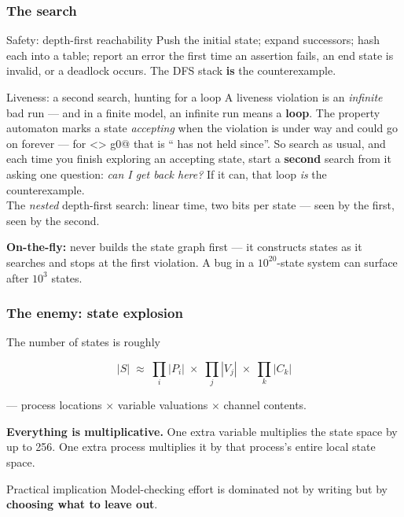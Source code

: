 \begin{frame}
  \frametitle{The search} \small

\begin{block}{Safety: depth-first reachability}\small
Push the initial state; expand successors; hash each into a table; report an error
the first time an assertion fails, an end state is invalid, or a deadlock occurs.
The DFS stack {\bf is} the counterexample.
\end{block}

\pause

\begin{block}{Liveness: a second search, hunting for a loop}\small
A liveness violation is an {\em infinite} bad run --- and in a finite model, an
infinite run means a {\bf loop}. The property automaton marks a state
{\em accepting} when the violation is under way and could go on forever --- for
\ipromela@[]<> g0@ that is `` has not held since''.
So search as usual, and each time you finish exploring an accepting state, start a
{\bf second} search from it asking one question: {\em can I get back here?} If it
can, that loop {\em is} the counterexample.\\[0.15cm]
The {\em nested} depth-first search: linear time, two bits per state --- seen by
the first, seen by the second.
\end{block}

\pause
\vspace{0.15cm}

{\bf On-the-fly:} \spin{} never builds the state graph first --- it constructs
states as it searches and stops at the first violation. A bug in a
$10^{20}$-state system can surface after $10^3$ states.

\end{frame}

\begin{frame}
  \frametitle{The enemy: state explosion} \small

The number of states is roughly

\[
|S| \;\approx\; \prod_{i} |P_i| \;\times\; \prod_{j} |V_j| \;\times\; \prod_{k} |C_k|
\]

--- process locations $\times$ variable valuations $\times$ channel contents.

\pause
\vspace{0.3cm}

{\bf Everything is multiplicative.} One extra  variable multiplies
the state space by up to 256. One extra process multiplies it by that process's
entire local state space.

\pause
\vspace{0.4cm}

\begin{block}{Practical implication}\small
Model-checking effort is dominated not by writing \promelaname{} but by
{\bf choosing what to leave out}.
\end{block}

\end{frame}

